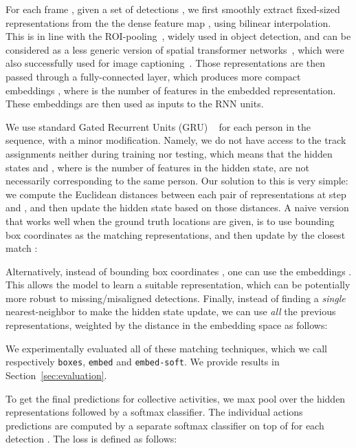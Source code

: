 \documentclass[10pt,twocolumn,letterpaper]{article}
\begin{document}
For each frame , given a set of  detections , we first smoothly extract fixed-sized representations  from the the dense feature map , using
bilinear interpolation. This is in line
with the ROI-pooling~\cite{Ren2015}, widely used in object detection,  and can
be considered as a less generic version of spatial transformer
networks~\cite{Jaderberg2015}, which were also successfully used for image
captioning~\cite{Johnson2016}. Those representations  are then passed
through a fully-connected layer, which produces more compact embeddings
, where  is the number of features in the embedded
representation. These embeddings are then used as inputs to the RNN units.

We use standard Gated Recurrent Units (GRU) ~\cite{Chung2014} for each person in 
the sequence, with a minor modification. Namely, we do not have access to the track
assignments neither during training nor testing, which means that the hidden states 
 and , where  is the number 
of features in the hidden state, are not necessarily corresponding to the same person. 
Our solution to this is very simple: we compute the Euclidean distances between each
pair of representations at step  and , and then update the hidden state
based on those distances. A naive version that works well when the ground truth
locations are given, is to use bounding box coordinates  as the
matching representations, and then update  by the closest match
:

\vspace{-0.25cm}


Alternatively, instead of bounding box coordinates , one can use the
embeddings . This allows the model to learn a 
suitable representation, which can be potentially more robust to missing/misaligned
detections. Finally, instead of finding a \textit{single}
nearest-neighbor to make the hidden state update, we can use \textit{all} 
the previous representations, weighted by the distance in the embedding space as 
follows:
\vspace{-0.25cm}


We experimentally evaluated all of these
matching techniques, which we call respectively \texttt{boxes},
\texttt{embed} and \texttt{embed-soft}. We provide results 
in Section~\ref{sec:evaluation}.

To get the final predictions  for collective activities, we max pool over the
hidden representations  followed by a softmax classifier. 
The individual actions predictions  are computed by a separate softmax 
classifier on top of  for each detection . The loss is defined as follows:
\vspace{-0.25cm}
\end{document}
